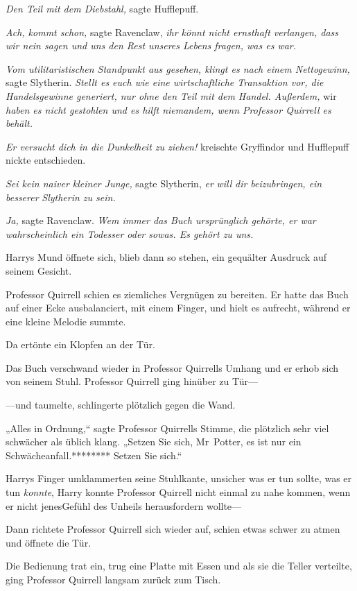 {\emph{Den Teil mit dem Diebstahl,} sagte Hufflepuff.

\emph{Ach, kommt schon,} sagte Ravenclaw, \emph{ihr könnt nicht ernsthaft verlangen, dass wir nein sagen und uns den Rest unseres Lebens fragen, was es war.}

\emph{Vom utilitaristischen Standpunkt aus gesehen, klingt es nach einem Nettogewinn,} sagte Slytherin. \emph{Stellt es euch wie eine wirtschaftliche Transaktion vor, die Handelsgewinne generiert, nur ohne den Teil mit dem Handel. Außerdem,} wir \emph{haben es nicht gestohlen und es hilft niemandem, wenn Professor Quirrell es behält.}

\emph{Er versucht dich in die Dunkelheit zu ziehen!} kreischte Gryffindor und Hufflepuff nickte entschieden.

\emph{Sei kein naiver kleiner Junge,} sagte Slytherin, \emph{er} \emph{will} \emph{dir beizubringen, ein} \emph{besserer} \emph{Slytherin zu sein.}

\emph{Ja,} sagte Ravenclaw. \emph{Wem immer das Buch ursprünglich gehörte, er war wahrscheinlich ein Todesser oder sowas. Es gehört zu uns.}

Harrys Mund öffnete sich, blieb dann so stehen, ein gequälter Ausdruck auf seinem Gesicht.

Professor Quirrell schien es ziemliches Vergnügen zu bereiten. Er hatte das Buch auf einer Ecke ausbalanciert, mit einem Finger, und hielt es aufrecht, während er eine kleine Melodie summte.

Da ertönte ein Klopfen an der Tür.

Das Buch verschwand wieder in Professor Quirrells Umhang und er erhob sich von seinem Stuhl. Professor Quirrell ging hinüber zu Tür—

—und taumelte, schlingerte plötzlich gegen die Wand.

„Alles in Ordnung,“ sagte Professor Quirrells Stimme, die plötzlich sehr viel schwächer als üblich klang. „Setzen Sie sich, Mr~Potter, es ist nur ein Schwächeanfall.******** Setzen Sie sich.“

Harrys Finger umklammerten seine Stuhlkante, unsicher was er tun sollte, was er tun \emph{konnte}, Harry konnte Professor Quirrell nicht einmal zu nahe kommen, wenn er nicht jenesGefühl des Unheils herausfordern wollte—

Dann richtete Professor Quirrell sich wieder auf, schien etwas schwer zu atmen und öffnete die Tür.

Die Bedienung trat ein, trug eine Platte mit Essen und als sie die Teller verteilte, ging Professor Quirrell langsam zurück zum Tisch.

}
